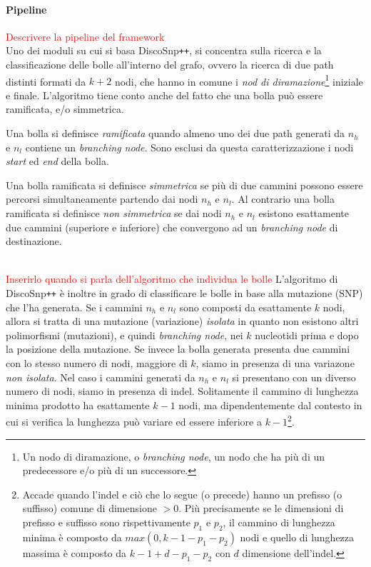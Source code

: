 \documentclass[../main.tex]{subfiles}
\begin{document}
\paragraph{Pipeline} \textcolor{red}{Descrivere la pipeline del framework}
\\
Uno dei moduli su cui si basa DiscoSnp\texttt{++}, si concentra sulla ricerca e la classificazione delle bolle all'interno del grafo, ovvero la ricerca di due path distinti formati da $k+2$ nodi, che hanno in comune i \textit{nod di diramazione}\footnote{Un nodo di diramazione, o \textit{branching node}, un nodo che ha più di un predecessore e/o più di un successore.} iniziale e finale. L'algoritmo tiene conto anche del fatto che una bolla può essere ramificata, e/o simmetrica.

\begin{definition}
Una bolla si definisce \textit{ramificata} quando almeno uno dei due path generati da $n_h$ e $n_l$ contiene un \textit{branching node}. Sono esclusi da questa caratterizzazione i nodi \textit{start} ed \textit{end} della bolla.
\end{definition}

\begin{definition}
Una bolla ramificata si definisce \textit{simmetrica} se più di due cammini possono essere percorsi simultaneamente partendo dai nodi $n_h$ e $n_l$. Al contrario una bolla ramificata si definisce \textit{non simmetrica} se dai nodi $n_h$ e $n_l$ esistono esattamente due cammini (superiore e inferiore) che convergono ad un \textit{branching node} di destinazione.
\end{definition}

\noindent
\\
\textcolor{red}{Inserirlo quando si parla dell'algoritmo che individua le bolle} 
L'algoritmo di DiscoSnp\texttt{++} è inoltre in grado di classificare le bolle in base alla mutazione (SNP) che l'ha generata. Se i cammini $n_h$ e $n_l$ sono composti da esattamente $k$ nodi, allora si tratta di una mutazione (variazione) \textit{isolata} in quanto non esistono altri polimorfismi (mutazioni), e quindi \textit{branching node}, nei $k$ nucleotidi prima e dopo la posizione della mutazione. Se invece la bolla generata presenta due cammini con lo stesso numero di nodi, maggiore di $k$, siamo in presenza di una variazone \textit{non isolata}. Nel caso i cammini generati da $n_h$ e $n_l$ si presentano con un diverso numero di nodi, siamo in presenza di indel. Solitamente il cammino di lunghezza minima prodotto ha esattamente $k-1$ nodi, ma dipendentemente dal contesto in cui si verifica la lunghezza può variare ed essere inferiore a $k-1$\footnote{Accade quando l'indel e ciò che lo segue (o precede) hanno un prefisso (o suffisso) comune di dimensione $> 0$. Più precisamente se le dimensioni di prefisso e suffisso sono rispettivamente $p_1$ e $p_2$, il cammino di lunghezza minima è composto da $max(0, k-1-p_1 - p_2)$ nodi e quello di lunghezza massima è composto da $k-1+d-p_1 - p_2$ con $d$ dimensione dell'indel.}.
\end{document}
